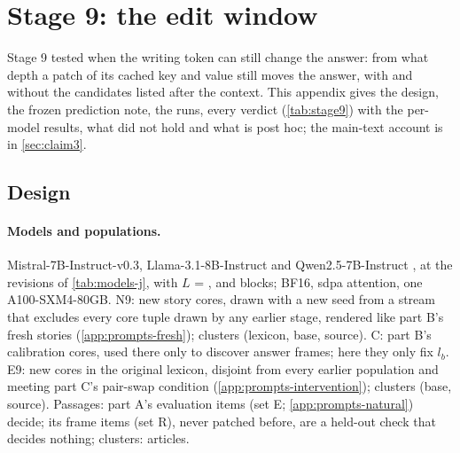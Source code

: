 \section{Stage 9: the edit window}\label{app:stage9}

\providecommand{\SnineCI}[3]{#1\,{\scriptsize[#2, #3]}}%
\providecommand{\SnineSt}[3]{\begin{tabular}[t]{@{}c@{}}#1\\[-1.5pt]{\tiny[#2, #3]}\end{tabular}}%

Stage 9 tested when the writing token can still change the answer: from what depth a patch of its cached key and value still moves the answer, with and without the candidates listed after the context. This appendix gives the design, the frozen prediction note, the runs, every verdict (\cref{tab:stage9}) with the per-model results, what did not hold and what is post hoc; the main-text account is in \cref{sec:claim3}.

\subsection{Design}\label{app:s9-design}

\paragraph{Models and populations.} Mistral-7B-Instruct-v0.3, Llama-3.1-8B-Instruct and Qwen2.5-7B-Instruct \citep{jiang2023mistral,grattafiori2024llama3,yang2024qwen25}, at the revisions of \cref{tab:models-j}, with $L$ = \NqLayersMistralSeven{}, \NqLayersLlamaEight{} and \NqLayersQwenSeven{} blocks; BF16, sdpa attention, one A100-SXM4-80GB. N9: \NqStories{} new story cores, drawn with a new seed from a stream that excludes every core tuple drawn by any earlier stage, rendered like part B's fresh stories (\cref{app:prompts-fresh}); clusters (lexicon, base, source). C: part B's \NqCalib{} calibration cores, used there only to discover answer frames; here they only fix $l_b$. E9: \NqCores{} new cores in the original lexicon, disjoint from every earlier population and meeting part C's pair-swap condition (\cref{app:prompts-intervention}); clusters (base, source). Passages: part A's \NqPassages{} evaluation items (set E; \cref{app:prompts-natural}) decide; its \NqPassagesR{} frame items (set R), never patched before, are a held-out check that decides nothing; clusters: articles.

